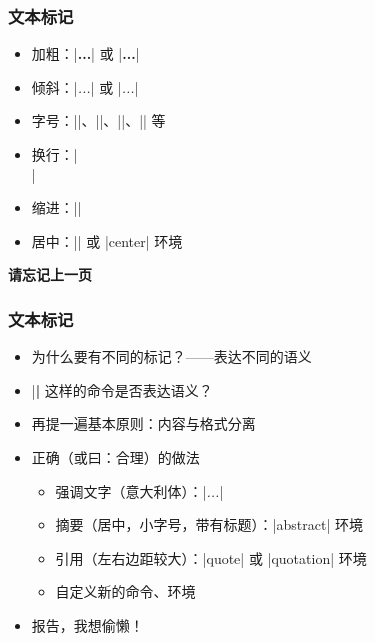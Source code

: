 \begin{frame}[fragile]
\frametitle{文本标记}
\begin{itemize}
  \item 加粗：|{\bfseries ...}| 或 |\textbf{...}|
  \item 倾斜：|{\itshape ...}| 或 |\textit{...}|
  \item 字号：|\tiny|、|\small|、|\large|、|\Large| 等
  \item 换行：|\\|
  \item 缩进：|\indent|
  \item 居中：|\centering| 或 |center| 环境
\end{itemize}
\end{frame}

\begin{frame}[standout]
  \huge \textbf{请忘记上一页}
\end{frame}

\begin{frame}[fragile]
\frametitle{文本标记}
\begin{itemize}
  \item 为什么要有不同的标记？\pause\mbox{}——表达不同的\alert{语义} \pause
  \item |\textbf| 这样的命令是否表达语义？ \pause
  \item 再提一遍基本原则：\alert{内容与格式分离} \pause
  \item 正确（或曰：合理）的做法
    \begin{itemize}
      \item 强调文字（意大利体）：|\emph{...}|
      \item 摘要（居中，小字号，带有标题）：|abstract| 环境
      \item 引用（左右边距较大）：|quote| 或 |quotation| 环境
      \item 自定义新的命令、环境
    \end{itemize} \pause
  \item 报告，我想偷懒！
\end{itemize}
\end{frame}

